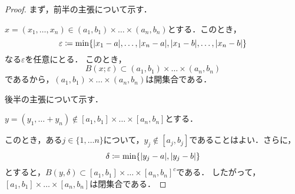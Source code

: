 \documentclass[dvipdfmx,uplatex,11pt]{jsarticle}
\begin{document}
\begin{leftbar}
    \begin{proof}
        まず，前半の主張について示す．

        $x=(x_1  , \dots , x_n)\in　(a_1 , b_1) \times \dots \times (a_n , b_n)$とする．このとき，
        \[
            \varepsilon \coloneqq \min \{ \abs{x_1-a},\dots,\abs{x_n -a},\abs{x_1-b},\dots, \abs{x_n-b} \}
        \]
        なる$\varepsilon$を任意にとる．
        このとき，
        \[
            B(x;\varepsilon) \subset (a_1 , b_1) \times \dots \times (a_n , b_n)
        \]
        であるから，$(a_1 , b_1) \times \dots \times (a_n , b_n)$は開集合である．

        後半の主張について示す．
        
        $ y = (y_1 , \dots + y_n ) \notin [a_1 , b_1] \times \dots \times [a_n , b_n]$とする．

        このとき，ある$j \in \{1,\dots n\}$について，$y_j \notin [a_j , b_j]$であることはよい．さらに，
        \[
            \delta \coloneqq \min  \{ \abs{y_j -a},\abs{y_j - b}\}
        \]
        とすると，$ B(y , \delta ) \subset {[a_1,b_1] \times \dots \times [a_n , b_n]}^c$である．
        したがって，$[a_1,b_1] \times \dots \times [a_n , b_n]$は閉集合である．
    \end{proof}
    \end{leftbar}
\end{document}
